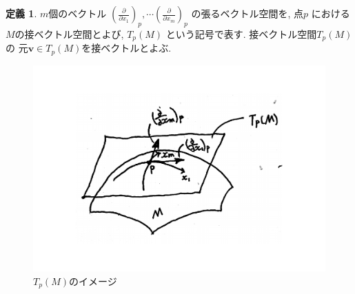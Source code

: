 \documentclass[dvipdfmx,cjk]{beamer}
\theoremstyle{definition}
\newtheorem{dfn}{\textbf{ 定義 }}
\begin{document}
\begin{frame}
  \begin{dfn}\label{def:tangent vector space}
    $m$個のベクトル
    $\left(\frac{\partial}{\partial x_1}\right)_p, 
    \cdots 
    \left(\frac{\partial}{\partial x_m}\right)_p$
    の張るベクトル空間を, 点$p$
    における$M$の接ベクトル空間とよび, 
    $T_p(M)$
    という記号で表す. 接ベクトル空間$T_p(M)$の
    元$\boldsymbol{v}\in T_p(M)$を接ベクトルとよぶ. 
  \end{dfn}
  \begin{figure}[H]
        \centering
        \includegraphics[keepaspectratio, scale=0.28]{tangentVectorSpace_2.pdf}
        \caption{$T_p(M)$のイメージ}
        \label{}
  \end{figure}

\end{frame}
\end{document}
